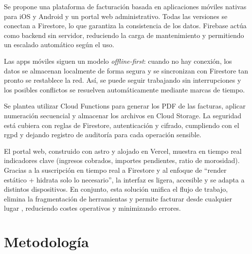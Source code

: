 \begin{large}

Se propone una plataforma de facturación basada en aplicaciones móviles nativas para iOS y Android y un portal web administrativo. Todas las versiones se conectan a Firestore, lo que garantiza la consistencia de los datos. Firebase actúa como backend sin servidor, reduciendo la carga de mantenimiento y permitiendo un escalado automático según el uso.

Las apps móviles siguen un modelo \textit{offline-first}: cuando no hay conexión, los datos se almacenan localmente de forma segura y se sincronizan con Firestore tan pronto se restablece la red. Así, se puede seguir trabajando sin interrupciones y los posibles conflictos se resuelven automáticamente mediante marcas de tiempo.

Se plantea utilizar Cloud Functions para generar los PDF de las facturas, aplicar numeración secuencial y almacenar los archivos en Cloud Storage. La seguridad está cubiera con reglas de Firestore, autenticación y cifrado, cumpliendo con el \gls{rgpd} y dejando registro de auditoría para cada operación sensible.

El portal web, construido con \gls{astro} y alojado en Vercel, muestra en tiempo real indicadores clave (ingresos cobrados, importes pendientes, ratio de morosidad). Gracias a la suscripción en tiempo real a Firestore y al enfoque de “render estático + hidrata solo lo necesario”, la interfaz es ligera, accesible y se adapta a distintos dispositivos. En conjunto, esta solución unifica el flujo de trabajo, elimina la fragmentación de herramientas y permite facturar desde cualquier lugar , reduciendo costes operativos y minimizando errores.

\end{large}

\section{Metodología}


